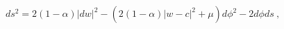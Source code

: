 \begin{equation*}
  ds^2 = 2 (1-\alpha) |dw|^2 - ( 2 (1-\alpha) |w - c|^2 + \mu) d\phi^2
  - 2d\phi ds~,
\end{equation*}

